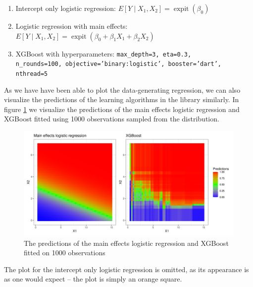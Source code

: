 \documentclass[11pt, a4paper]{article}
\theoremstyle{definition}
\theoremstyle{remark}
\DeclareMathOperator{\expit}{expit}
\begin{document}
\begin{enumerate}
    \item Intercept only logistic regression: $E[Y \mid X_1, X_2] = \expit(\beta_0)$
    \item Logistic regression with main effects: $E[Y \mid X_1, X_2] = \expit(\beta_0 + \beta_1 X_1 + \beta_2 X_2)$
    \item XGBoost with hyperparameters: \texttt{max\_depth=3, eta=0.3,\\ n\_rounds=100, objective='binary:logistic', booster='dart', nthread=5}
\end{enumerate}
As we have have been able to plot the data-generating regression, we can also visualize the predictions of the learning algorithms in the library similarly. In figure \ref{fig:predictpar} we visualize the predictions of the main effects logistic regression and XGBoost fitted using 1000 observations sampled from the distribution. 
\begin{figure}
    \centering
    \includegraphics[width=\textwidth]{figures/predictpar.png}
    \caption{The predictions of the main effects logistic regression and XGBoost fitted on 1000 observations}
    \label{fig:predictpar}
\end{figure}
The plot for the intercept only logistic regression is omitted, as its appearance is as one would expect -- the plot is simply an orange square.
\end{document}
